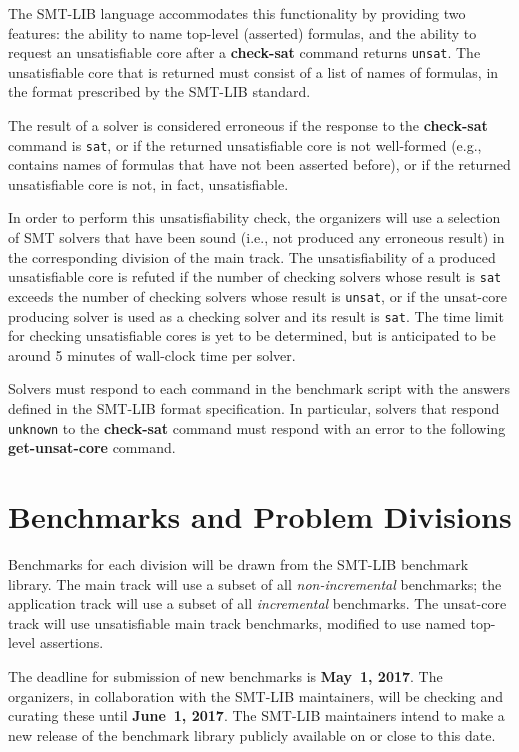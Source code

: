\documentclass[12pt]{article}
\newcommand{\akey}[1]{\textbf{#1}}
\begin{document}
The SMT-LIB language accommodates this functionality by providing two
features: the ability to name top-level (asserted) formulas, and the
ability to request an unsatisfiable core after a \akey{check-sat}
command returns \texttt{unsat}.  The unsatisfiable core that is
returned must consist of a list of names of formulas, in the format
prescribed by the SMT-LIB standard.

The result of a solver is considered erroneous if the response to the
\akey{check-sat} command is \texttt{sat}, or if the returned
unsatisfiable core is not well-formed (e.g., contains names of
formulas that have not been asserted before), or if the returned
unsatisfiable core is not, in fact, unsatisfiable.

In order to perform this unsatisfiability check, the organizers will
use a selection of SMT solvers that have been sound (i.e., not
produced any erroneous result) in the corresponding division of the
main track.  The unsatisfiability of a produced unsatisfiable core is
refuted if the number of checking solvers whose result is \texttt{sat}
exceeds the number of checking solvers whose result is \texttt{unsat},
or if the unsat-core producing solver is used as a checking solver and
its result is \texttt{sat}.  The time limit for checking unsatisfiable
cores is yet to be determined, but is anticipated to be around 5
minutes of wall-clock time per solver.

Solvers must respond to each command in the benchmark script with the
answers defined in the SMT-LIB format specification.  In particular,
solvers that respond \texttt{unknown} to the \akey{check-sat} command
must respond with an error to the following \akey{get-unsat-core}
command.


\section{Benchmarks and Problem Divisions}

%
Benchmarks for each division will be drawn from the SMT-LIB benchmark
library.  The main track will use a subset of all
\emph{non-incremental} benchmarks; the application track will use a
subset of all \emph{incremental} benchmarks.  The unsat-core track
will use unsatisfiable main track benchmarks, modified to use named
top-level assertions.

%
The deadline for submission of new benchmarks is {\bf May~1, 2017}.
The organizers, in collaboration with the SMT-LIB maintainers, will be
checking and curating these until {\bf June~1, 2017}.  The SMT-LIB
maintainers intend to make a new release of the benchmark library
publicly available on or close to this date.
\end{document}
